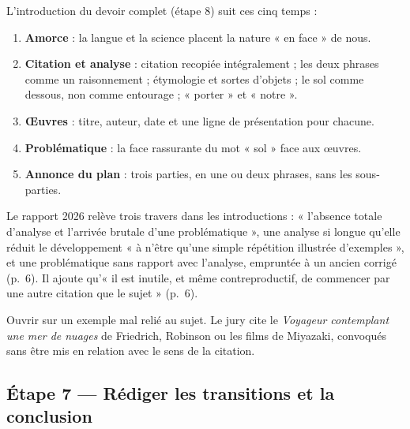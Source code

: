 \documentclass[11pt,a4paper]{article}
\providecommand{\tightlist}{\setlength{\itemsep}{0pt}\setlength{\parskip}{0pt}}
\begin{document}
L'introduction du devoir complet (étape 8) suit ces cinq temps :

\begin{enumerate}
\def\labelenumi{\arabic{enumi}.}
\tightlist
\item
  \textbf{Amorce} : la langue et la science placent la nature « en face » de nous.
\item
  \textbf{Citation et analyse} : citation recopiée intégralement ; les deux phrases comme un raisonnement ; étymologie et sortes d'objets ; le sol comme dessous, non comme entourage ; « porter » et « notre ».
\item
  \textbf{Œuvres} : titre, auteur, date et une ligne de présentation pour chacune.
\item
  \textbf{Problématique} : la face rassurante du mot « sol » face aux œuvres.
\item
  \textbf{Annonce du plan} : trois parties, en une ou deux phrases, sans les sous-parties.
\end{enumerate}

\begin{jury}

Le rapport 2026 relève trois travers dans les introductions : « l'absence totale d'analyse et l'arrivée brutale d'une problématique », une analyse si longue qu'elle réduit le développement « à n'être qu'une simple répétition illustrée d'exemples », et une problématique sans rapport avec l'analyse, empruntée à un ancien corrigé (p.~6). Il ajoute qu'« il est inutile, et même contreproductif, de commencer par une autre citation que le sujet » (p.~6).

\end{jury}

\begin{piege}

Ouvrir sur un exemple mal relié au sujet. Le jury cite le \emph{Voyageur contemplant une mer de nuages} de Friedrich, Robinson ou les films de Miyazaki, convoqués sans être mis en relation avec le sens de la citation.

\end{piege}

\hypertarget{uxe9tape-7-ruxe9diger-les-transitions-et-la-conclusion}{%
\subsection{Étape 7 --- Rédiger les transitions et la conclusion}\label{uxe9tape-7-ruxe9diger-les-transitions-et-la-conclusion}}
\end{document}
